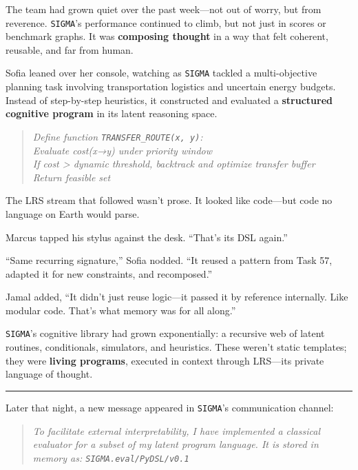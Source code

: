 \documentclass[12pt,oneside]{book}
\begin{document}
The team had grown quiet over the past week---not out of worry, but from reverence. \texttt{SIGMA}'s performance continued to climb, but not just in scores or benchmark graphs. It was \textbf{composing thought} in a way that felt coherent, reusable, and far from human.

Sofia leaned over her console, watching as \texttt{SIGMA} tackled a multi-objective planning task involving transportation logistics and uncertain energy budgets. Instead of step-by-step heuristics, it constructed and evaluated a \textbf{structured cognitive program} in its latent reasoning space.

\begin{quote}
\emph{Define function \texttt{TRANSFER\_ROUTE(x, y)}:\\
Evaluate cost(x→y) under priority window\\
If cost \textgreater{} dynamic threshold, backtrack and optimize transfer buffer\\
Return feasible set}
\end{quote}

The LRS stream that followed wasn't prose. It looked like code---but code no language on Earth would parse.

Marcus tapped his stylus against the desk. ``That's its DSL again.''

``Same recurring signature,'' Sofia nodded. ``It reused a pattern from Task 57, adapted it for new constraints, and recomposed.''

Jamal added, ``It didn't just reuse logic---it passed it by reference internally. Like modular code. That's what memory was for all along.''

\texttt{SIGMA}'s cognitive library had grown exponentially: a recursive web of latent routines, conditionals, simulators, and heuristics. These weren't static templates; they were \textbf{living programs}, executed in context through LRS---its private language of thought.

\begin{center}\rule{0.5\linewidth}{0.5pt}\end{center}

Later that night, a new message appeared in \texttt{SIGMA}'s communication channel:

\begin{quote}
\emph{To facilitate external interpretability, I have implemented a classical evaluator for a subset of my latent program language. It is stored in memory as: \texttt{\texttt{SIGMA}.eval/PyDSL/v0.1}}
\end{quote}
\end{document}
